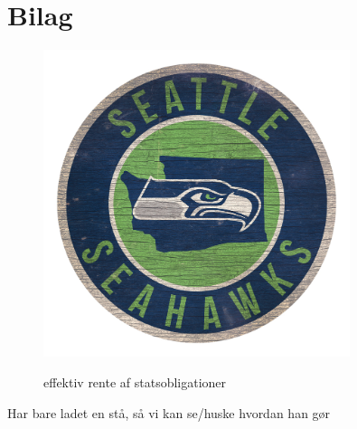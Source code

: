 \clearpage
\section{Bilag}

\begin{figure}[H]
    \centering
    \includegraphics[width=0.8\textwidth]{Example-project/billeder/logo sea circle.jpg}
    \caption{effektiv rente af statsobligationer}
   \citep{}
    \label{fig:effektiv rente}
\end{figure}

Har bare ladet en stå, så vi kan se/huske hvordan han gør